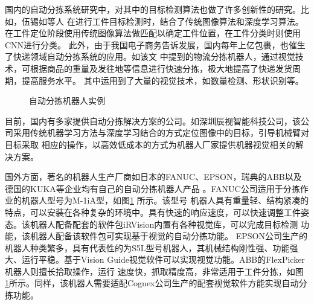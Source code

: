 国内的自动分拣系统研究中，对其中的目标检测算法也做了许多创新性的研究。比如，伍锡如等人  \cite{WXR2016}
在进行工件目标检测时，结合了传统图像算法和深度学习算法。在工件定位阶段使用传统图像算法做匹配以确定工件位置，在工件分类时则使用CNN进行分类。
此外，由于我国电子商务告诉发展，国内每年上亿包裹，也催生了快递领域自动分拣系统的应用。如该文    \cite{kuaidi}
中提到的物流分拣机器人，通过视觉技术，可根据商品的重量及发往地等信息进行快速分拣，极大地提高了快递发货周期，提高服务水平。
其中运用到了大量的视觉技术，如数量检测、形状识别等。
\begin{figure}[t]
    \centering
    \caption{自动分拣机器人实例}
    \label{fig:robot_example}
\end{figure}

目前，国内有多家提供自动分拣解决方案的公司。如深圳辰视智能科技公司，该公司采用传统机器学习方法与深度学习结合的方式定位图像中的目标，引导机械臂对目标采取
相应的操作，以高效低成本的方式为机器人厂家提供机器视觉相关的解决方案。

国外方面，著名的机器人生产厂商如日本的FANUC、EPSON，瑞典的ABB以及德国的KUKA等企业均有自己的自动分拣机器人产品   \cite{HZQ:2016}
。FANUC公司适用于分拣作业的机器人型号为M-1iA型，如图\ref{fig:robot_example}
所示。该型号
机器人具有重量轻、结构紧凑的特点，可以安装在各种复杂的环境中。具有快速的响应速度，可以快速调整工件姿态。该机器人配备配套的软件包iRVision内置有各种视觉库，可以完成目标检测
功能，该机器人配备该软件包可实现基于视觉的自动分拣功能。
EPSON公司生产的机器人种类繁多，具有代表性的为S5L型号机器人，其机械结构刚性强、功能强大、运行平稳。基于Vision Guide视觉软件可以实现视觉功能。ABB的FlexPicker机器人则擅长拾取操作，运行
速度快，抓取精度高，非常适用于工件分拣，如图
\ref{fig:robot_example}所示。同样，该机器人需要适配Cognex公司生产的配套视觉软件方能实现自动分拣功能。

